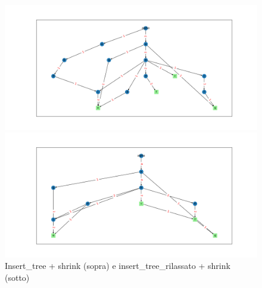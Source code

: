 \documentclass{article}
\begin{document}
\begin{figure}[H]
    \centering
    \includegraphics[max width=\linewidth, max height=0.9\textheight, keepaspectratio]{Resources/Uguaglianza+shrink.png}
    
    \includegraphics[max width=\linewidth, max height=0.9\textheight, keepaspectratio]{Resources/insert_tree_rilassato+shrink.png}
    \caption{Insert\_tree + shrink (sopra) e insert\_tree\_rilassato + shrink (sotto)}
    \label{fig:esempio2}
\end{figure}
\end{document}

